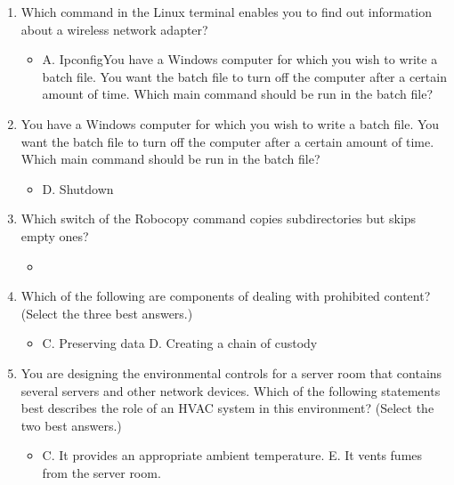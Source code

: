 \documentclass{article}
\begin{document}
\begin{enumerate}
    \item Which command in the Linux terminal enables you to find out
information about a wireless network adapter?
    \begin{itemize}
        \item A. IpconfigYou have a Windows computer for which you wish to write a batch
file. You want the batch file to turn off the computer after a certain
amount of time. Which main command should be run in the
batch file?
    \end{itemize}
    \item You have a Windows computer for which you wish to write a batch
file. You want the batch file to turn off the computer after a certain
amount of time. Which main command should be run in the
batch file?
    \begin{itemize}
        \item D. Shutdown
    \end{itemize}
    \item Which switch of the Robocopy command copies subdirectories
but skips empty ones?
    \begin{itemize}
        \item 
    \end{itemize}
    \item Which of the following are components of dealing with prohibited
content? (Select the three best answers.)
    \begin{itemize}
        \item C. Preserving data D. Creating a chain of custody
    \end{itemize}
    \item You are designing the environmental controls for a server room
that contains several servers and other network devices. Which of
the following statements best describes the role of an HVAC
system in this environment? (Select the two best answers.)
    \begin{itemize}
        \item C. It provides an appropriate ambient temperature. E. It vents fumes from the server room.
    \end{itemize}
\end{enumerate}
\end{document}
